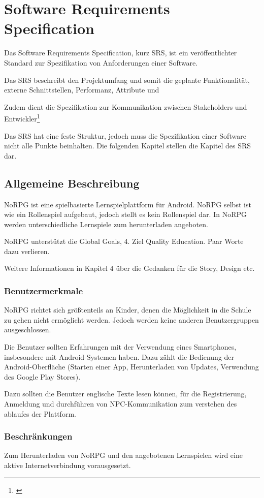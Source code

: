 \chapter{Software Requirements Specification}
	Das Software Requirements Specification, kurz SRS, ist ein veröffentlichter Standard zur Spezifikation von Anforderungen einer Software. 
	
	Das SRS beschreibt den Projektumfang und somit die geplante Funktionalität, externe Schnittstellen, Performanz, Attribute und 
	
	Zudem dient die Spezifikation zur Kommunikation zwischen Stakeholders und Entwickler\footnote{\cite{srsIEEE}}	
		
	Das SRS hat eine feste Struktur, jedoch muss die Spezifikation einer Software nicht alle Punkte beinhalten. Die folgenden Kapitel stellen die Kapitel des SRS dar.
	
\section{Allgemeine Beschreibung}
	NoRPG ist eine spielbasierte Lernspielplattform für Android. NoRPG selbst ist wie ein Rollenspiel aufgebaut, jedoch stellt es kein Rollenspiel dar. In NoRPG werden unterschiedliche Lernspiele zum herunterladen angeboten.
	
	NoRPG unterstützt die Global Goals, 4. Ziel Quality Education. Paar Worte dazu verlieren.	
	
	Weitere Informationen in Kapitel 4 über die Gedanken für die Story, Design etc.
	
	\subsection{Benutzermerkmale}
		NoRPG richtet sich größtenteils an Kinder, denen die Möglichkeit in die Schule zu gehen nicht ermöglicht werden. Jedoch werden keine anderen Benutzergruppen ausgeschlossen.
		
		Die Benutzer sollten Erfahrungen mit der Verwendung eines Smartphones, insbesondere mit Android-Systemen haben. Dazu zählt die Bedienung der Android-Oberfläche (Starten einer App, Herunterladen von Updates, Verwendung des Google Play Stores). 
		
		Dazu sollten die Benutzer englische Texte lesen können, für die Registrierung, Anmeldung und durchführen von NPC-Kommunikation zum verstehen des ablaufes der Plattform.
	
	\subsection{Beschränkungen} 
		Zum Herunterladen von NoRPG und den angebotenen Lernspielen wird eine aktive Internetverbindung vorausgesetzt.
		
